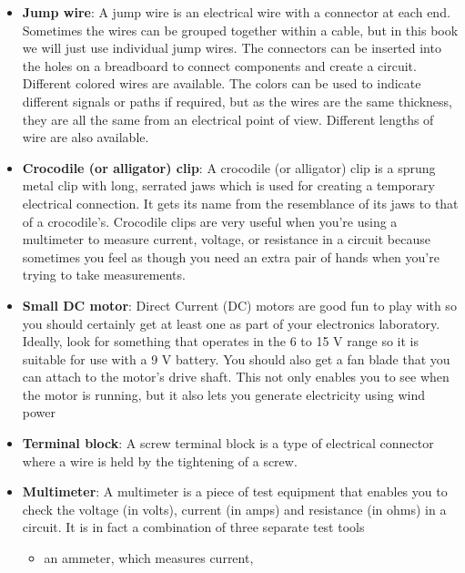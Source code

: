 \documentclass{report}
\begin{document}
\begin{itemize}
\begin{itemize}
                \item \textbf{Jump wire}: A jump wire is an electrical wire with a connector at each end. Sometimes the wires can be grouped together within a cable, but in this book we will just use individual jump wires.
                    \bigbreak \noindent 
                    The connectors can be inserted into the holes on a breadboard to connect components and create a circuit.
                    \bigbreak \noindent 
                    Different colored wires are available. The colors can be used to indicate different signals or paths if required, but as the wires are the same thickness, they are all the same from an electrical point of view. Different lengths of wire are also available.
                \item \textbf{Crocodile (or alligator) clip}: A crocodile (or alligator) clip is a sprung metal clip with long, serrated jaws which is used for creating a temporary electrical connection. It gets its name from the resemblance of its jaws to that of a crocodile's.
                    \bigbreak \noindent 
                    Crocodile clips are very useful when you're using a multimeter to measure current, voltage, or resistance in a circuit because sometimes you feel as though you need an extra pair of hands when you're trying to take measurements.
                \item \textbf{Small DC motor}: Direct Current (DC) motors are good fun to play with so you should certainly get at least one as part of your electronics laboratory.
                    \bigbreak \noindent 
                    Ideally, look for something that operates in the 6 to 15 V range so it is suitable for use with a 9 V battery.
                    \bigbreak \noindent 
                    You should also get a fan blade that you can attach to the motor's drive shaft. This not only enables you to see when the motor is running, but it also lets you generate electricity using wind power
                \item \textbf{Terminal block}: A screw terminal block is a type of electrical connector where a wire is held by the tightening of a screw.
                \item \textbf{Multimeter}: A multimeter is a piece of test equipment that enables you to check the voltage (in volts), current (in amps) and resistance (in ohms) in a circuit. It is in fact a combination of three separate test tools
                    \begin{itemize}
                        \item an ammeter, which measures current,

\end{itemize}
\end{itemize}
\end{itemize}
\end{document}
